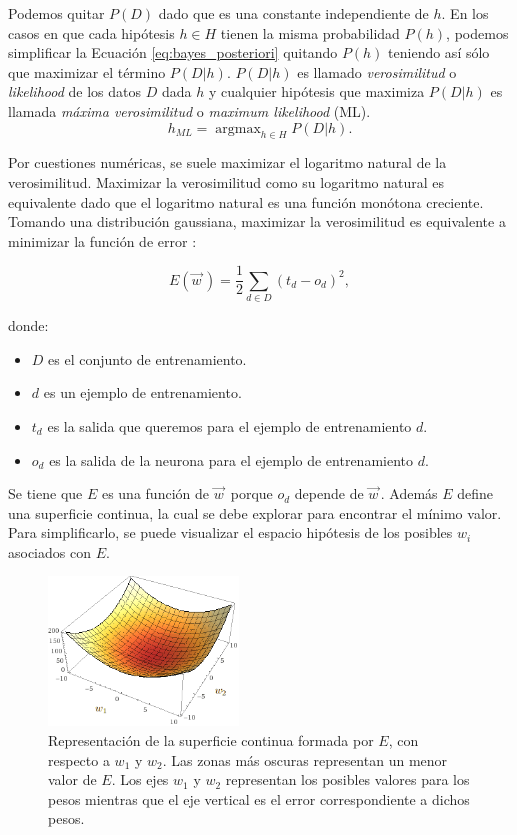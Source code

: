 \documentclass[spanish]{report}
\DeclareMathOperator*{\argmax}{argmax} %
\begin{document}
\noindent Podemos quitar $P(D)$ dado que es una constante independiente de $h$. En los casos en que cada hipótesis $h \in H$ tienen la misma probabilidad $P(h)$, podemos simplificar la Ecuación \ref{eq:bayes_posteriori} quitando $P(h)$ teniendo así sólo que maximizar el término $P(D|h)$. $P(D|h)$ es llamado \textit{verosimilitud} o \textit{likelihood} de los datos $D$ dada $h$ y cualquier hipótesis que maximiza $P(D|h)$ es llamada \textit{máxima verosimilitud} o \textit{maximum likelihood} (ML).
\begin{equation}\label{eq:bayes_ml}
h_{ML} = \argmax_{h \in H}{P(D|h)}.
\end{equation}


\noindent Por cuestiones numéricas, se suele maximizar el logaritmo natural de la verosimilitud. Maximizar la verosimilitud como su logaritmo natural es equivalente dado que el logaritmo natural es una función monótona creciente.\\

Tomando una distribución gaussiana, maximizar la verosimilitud es equivalente a minimizar la función de error \cite{Mitchell97a}:

\begin{equation}\label{eq:funcion_error}
E(\vec{w}^{\,}) = \dfrac{1}{2}\sum_{d \in D}{}{(t_d - o_d)^2},
\end{equation}

\noindent donde:

\begin{itemize}
\item $D$ es el conjunto de entrenamiento.
\item $d$ es un ejemplo de entrenamiento.
\item $t_d$ es la salida que queremos para el ejemplo de entrenamiento $d$.
\item $o_d$ es la salida de la neurona para el ejemplo de entrenamiento $d$.
\end{itemize}

\noindent Se tiene que $E$ es una función de $\vec{w}^{\,}$ porque $o_d$ depende de $\vec{w}^{\,}$. Además $E$ define una superficie continua, la cual se debe explorar para encontrar el mínimo valor. Para simplificarlo, se puede visualizar el espacio hipótesis de los posibles $w_i$ asociados con $E$.

\begin{figure}[H]
\centering
 \includegraphics[height=150px,keepaspectratio]{descenso_gradiente_1.png}
  \caption{Representación de la superficie continua formada por $E$, con respecto a $w_1$ y $w_2$. Las zonas más oscuras representan un menor valor de $E$. Los ejes $w_1$ y $w_2$ representan los posibles valores para los pesos mientras que el eje vertical es el error correspondiente a dichos pesos.}
  \label{fig:descenso_gradiente}
\end{figure}
\end{document}
